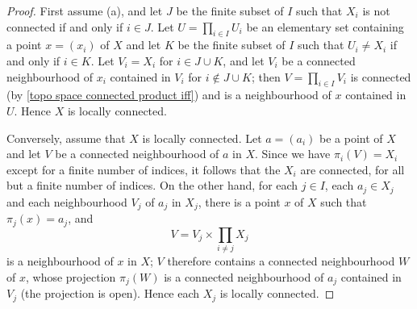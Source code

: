 \begin{proof}
First assume (a), and let $J$ be the finite subset of $I$ such that $X_i$ is not connected if and only if $i\in J$. Let $U=\prod_{i\in I}U_i$ be an elementary set containing a point $x=(x_i)$ of $X$ and let $K$ be the finite subset of $I$ such that $U_i\neq X_i$ if and only if $i\in K$. Let $V_i=X_i$ for $i\in J\cup K$, and let $V_i$ be a connected neighbourhood of $x_i$ contained in $V_i$ for $i\notin J\cup K$; then $V=\prod_{i\in I}V_i$ is connected (by \cref{topo space connected product iff}) and is a neighbourhood of $x$ contained in $U$. Hence $X$ is locally connected.\par
Conversely, assume that $X$ is locally connected. Let $a=(a_i)$ be a point of $X$ and let $V$ be a connected neighbourhood of $a$ in $X$. Since we have $\pi_i(V)=X_i$ except for a finite number of indices, it follows that the $X_i$ are connected, for all but a finite number of indices. On the other hand, for each $j\in I$, each $a_j\in X_j$ and each neighbourhood $V_j$ of $a_j$ in $X_j$, there is a point $x$ of $X$ such that $\pi_j(x)=a_j$, and
\[V=V_j\times\prod_{i\neq j}X_j\]
is a neighbourhood of $x$ in $X$; $V$ therefore contains a connected neighbourhood $W$ of $x$, whose projection $\pi_j(W)$ is a connected neighbourhood of $a_j$ contained in $V_j$ (the projection is open). Hence each $X_j$ is locally connected.
\end{proof}
